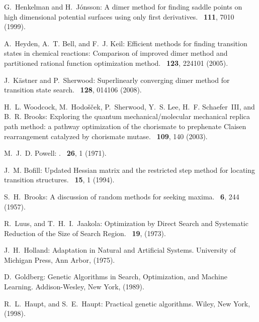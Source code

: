 \documentclass{article}
\begin{document}
\begin{thebibliography}{10}

G.~Henkelman and H.~J{\'o}nsson:
\newblock A dimer method for finding saddle points on high dimensional
  potential surfaces using only first derivatives.
~{\bf 111}, 7010  (1999).

A.~Heyden, A.~T. Bell, and F.~J. Keil:
\newblock Efficient methods for finding transition states in chemical
  reactions: Comparison of improved dimer method and partitioned rational
  function optimization method.
~{\bf 123}, 224101  (2005).

J.~K\"astner and P.~Sherwood:
\newblock Superlinearly converging dimer method for transition state search.
~{\bf 128}, 014106  (2008).

H.~L. Woodcock, M.~Hodo{\v s}{\v c}ek, P.~Sherwood, Y.~S. Lee, H.~F.
  Schaefer~III, and B.~R. Brooks:
\newblock Exploring the quantum mechanical/molecular mechanical replica path
  method: a pathway optimization of the chorismate to prephenate Claisen
  rearrangement catalyzed by chorismate mutase.
~{\bf 109}, 140  (2003).

M.~J.~D. Powell: .
~{\bf 26}, 1  (1971).

J.~M. Bofill:
\newblock Updated Hessian matrix and the restricted step method for locating
  transition structures.
~{\bf 15}, 1  (1994).

S.~H.~Brooks:
\newblock A discussion of random methods for seeking maxima.
~\textbf{6}, 244 (1957).

R.~Luus, and T.~H.~I.~Jaakola:
\newblock Optimization by Direct Search and Systematic Reduction of the Size of Search Region.
~\textbf{19}, (1973).

J.~H.~Holland:
\newblock Adaptation in Natural and Artificial Systems.
\newblock University of Michigan Press, Ann
  Arbor, (1975).

D.~Goldberg:
\newblock Genetic Algorithms in Search, Optimization, and Machine Learning.
\newblock Addison-Wesley, New York, (1989).

R.~L.~Haupt, and S.~E.~Haupt:
\newblock Practical genetic algorithms.
\newblock Wiley, New York, (1998).


\end{thebibliography}
\end{document}
